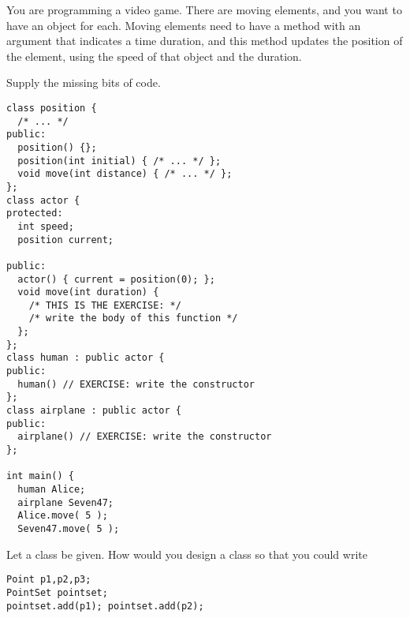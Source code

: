 \begin{exercise}
  You are programming a video game. There are moving elements, and you
  want to have an object for each. Moving elements need to have a
  method  with an argument that indicates a time duration, and
  this method updates the position of the element, using the speed of
  that object and the duration.

  Supply the missing bits of code.
\begin{verbatim}
class position {
  /* ... */
public:
  position() {};
  position(int initial) { /* ... */ };
  void move(int distance) { /* ... */ };
};
class actor {
protected:
  int speed;
  position current;

public:
  actor() { current = position(0); };
  void move(int duration) {
    /* THIS IS THE EXERCISE: */
    /* write the body of this function */
  };
};
class human : public actor {
public:
  human() // EXERCISE: write the constructor
};
class airplane : public actor {
public:
  airplane() // EXERCISE: write the constructor
};

int main() {
  human Alice;
  airplane Seven47;
  Alice.move( 5 );
  Seven47.move( 5 );
\end{verbatim}
\end{exercise}

\begin{exercise}
  \label{ex:pointset-add}
  Let a  class be given.
  How would you design a class  so that you could write
\begin{verbatim}
Point p1,p2,p3;
PointSet pointset;
pointset.add(p1); pointset.add(p2);
\end{verbatim}
\end{exercise}


